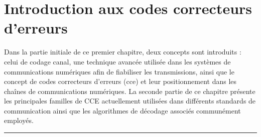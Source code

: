 \documentclass[../main.tex]{subfiles}
\begin{document}
%
%
%
%
\chapter{Introduction aux codes correcteurs d'erreurs} 
\label{chapter:2}
%
%
%
%
%
Dans la partie initiale de ce premier chapitre, deux concepts sont introduits : celui de codage canal, une technique avancée utilisée dans les systèmes de communications numériques afin de fiabiliser les transmissions, ainsi que le concept de codes correcteurs d'erreurs (\acrshort{cce}) et leur positionnement dans les chaînes de communications numériques. La seconde partie de ce chapitre présente les principales familles de CCE actuellement utilisées dans différents standards de communication ainsi que les algorithmes de décodage associés communément employés. 
%
%
%
%
%
%
%
\etocsettocstyle{
    { \large \hspace{-1.5 em} \textbf{} \hfill}
    \vspace{-2.5 em}\\\par\noindent\rule{\linewidth}{1 pt}\vspace{-.2 em}
    }
{\par\noindent\rule{\linewidth}{1 pt}\\}
\localtableofcontents
%
%
%
%
%
%
%
%
\end{document}

